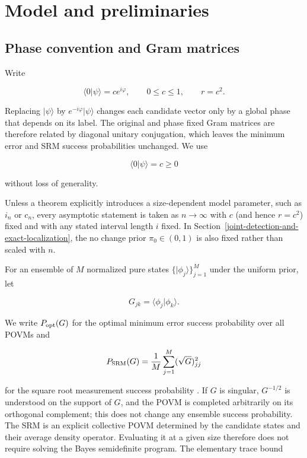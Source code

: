 \section{Model and preliminaries}\label{model-and-discrimination-preliminaries}

\subsection{Phase convention and Gram matrices}\label{phase-convention-and-gram-matrices}

Write

\[
\langle0|\psi\rangle=ce^{i\varphi},\qquad 0\le c\le1,
\qquad r=c^2.
\]

Replacing \(|\psi\rangle\) by \(e^{-i\varphi}|\psi\rangle\) changes each
candidate vector only by a global phase that depends on its label. The original
and phase fixed Gram matrices are therefore related by diagonal unitary
conjugation, which leaves the minimum error and SRM success probabilities
unchanged. We use

\[
\langle0|\psi\rangle=c\ge0
\]

without loss of generality.

Unless a theorem explicitly introduces a size-dependent model parameter,
such as \(i_n\) or \(c_n\), every asymptotic statement is taken as
\(n\to\infty\) with \(c\) (and hence \(r=c^2\)) fixed and with any stated
interval length \(i\) fixed. In
Section~\ref{joint-detection-and-exact-localization}, the no change prior
\(\pi_0\in(0,1)\) is also fixed rather than scaled with \(n\).

For an ensemble of \(M\) normalized pure states \(\{|\phi_j\rangle\}_{j=1}^M\)
under the uniform prior, let

\[
G_{jk}=\langle\phi_j|\phi_k\rangle.
\]

We write \(P_{\rm opt}(G)\) for the optimal minimum error success probability
over all POVMs
\cite{helstrom1976,holevo1973,yuen1975,barnett2009} and

\[
P_{\rm SRM}(G)=\frac1M\sum_{j=1}^M(\sqrt G)_{jj}^2
\]

for the square root measurement success probability
\cite{hausladen1994,eldar2001,dallapozza2015}. If \(G\) is singular,
\(G^{-1/2}\) is understood on the support of \(G\), and the POVM is completed
arbitrarily on its orthogonal complement; this does not change any ensemble
success probability. The SRM is an explicit collective POVM determined by the
candidate states and their average density operator. Evaluating it at a given
size therefore does not require solving the Bayes semidefinite program. The
elementary trace bound

